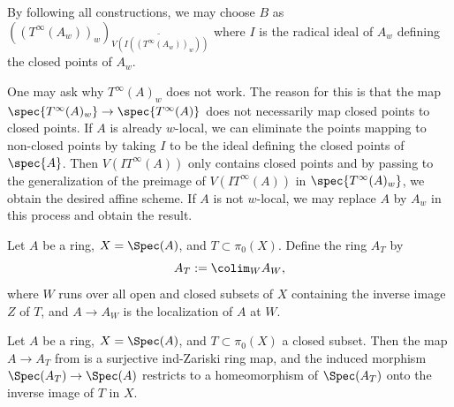 \begin{remark}
    By following all constructions, we may choose $B$
    as $((T^{\infty}(A_w))_w)_{\widetilde{V(I ((T^{\infty}(A_w))_w))}}$
    where $I$ is the radical ideal of $A_w$ defining the closed points of $A_w$.

    One may ask why $T^\infty(A)_w$ does not work. The reason for this is
    that the map $\spec{T^{\infty}(A)_w} \to \spec{T^{\infty}(A)}$ does not necessarily
    map closed points to closed points. If $A$ is already $w$-local,
    we can eliminate the points mapping to non-closed points by taking $I$ to be the ideal defining
    the closed points of $\spec{A}$.
    Then $V(I T^{\infty}(A))$ only contains closed points and by
    passing to the generalization of the preimage of $V(I T^{\infty}(A))$ in
    $\spec{T^{\infty}(A)_w}$, we obtain the desired affine scheme. If $A$ is not $w$-local,
    we may replace $A$ by $A_w$ in this process and obtain the result.
\end{remark}

\begin{definition}
  \label{def:colim-open-closed-localizations}
  \leanok
  Let $A$ be a ring, $X = \Spec(A)$, and $T \subset \pi_0(X)$. Define the ring $A_T$ by
  \[ 
    A_T := \colim_{W} A_W,
  \]
  where $W$ runs over all open and closed subsets of $X$ containing the inverse image $Z$ of $T$, 
  and $A \to A_W$ is the localization of $A$ at $W$.
\end{definition}

\begin{lemma}
  \label{thm:colim-open-closed-localizations-surj-ind-zariski}
  \leanok
  Let $A$ be a ring, $X = \Spec(A)$, and $T \subset \pi_0(X)$ a closed subset. 
  Then the map $A \to A_T$ from  is a surjective 
  ind-Zariski ring map, and the induced morphism $\Spec(A_T) \to \Spec(A)$ restricts to a 
  homeomorphism of $\Spec(A_T)$ onto the inverse image of $T$ in $X$.
\end{lemma}

